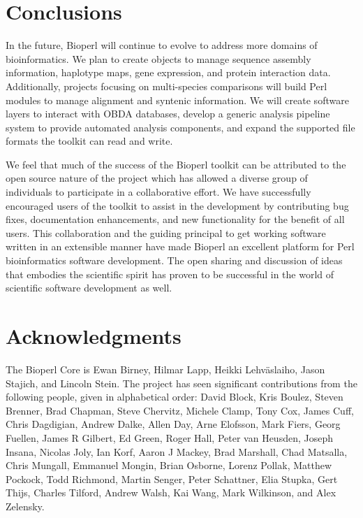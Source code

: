 \documentclass[12pt]{article}
\begin{document}
\section{Conclusions}

In the future, Bioperl will continue to evolve to address more domains
of bioinformatics.  We plan to create objects to manage sequence
assembly information, haplotype maps, gene expression, and protein
interaction data.  Additionally, projects focusing on multi-species
comparisons will build Perl modules to manage alignment and syntenic
information.  We will create software layers to interact with OBDA
databases, develop a generic analysis pipeline system to provide
automated analysis components, and expand the supported file formats
the toolkit can read and write.

We feel that much of the success of the Bioperl toolkit can be
attributed to the open source nature of the project which has allowed
a diverse group of individuals to participate in a collaborative effort.
We have successfully encouraged users of the toolkit to assist in the
development by contributing bug fixes, documentation enhancements, and
new functionality for the benefit of all users. This collaboration and
the guiding principal to get working software written in an extensible
manner have made Bioperl an excellent platform for Perl bioinformatics
software development.  The open sharing and discussion of ideas that
embodies the scientific spirit has proven to be successful in the
world of scientific software development as well.

\section{Acknowledgments}

The Bioperl Core is Ewan Birney, Hilmar Lapp, Heikki Lehv\"{a}slaiho,
Jason Stajich, and Lincoln Stein.  The project has seen significant
contributions from the following people, given in alphabetical order:
David Block, Kris Boulez, Steven Brenner, Brad Chapman, Steve
Chervitz, Michele Clamp, Tony Cox, James Cuff, Chris Dagdigian, Andrew
Dalke, Allen Day, Arne Elofsson, Mark Fiers, Georg Fuellen, James R
Gilbert, Ed Green, Roger Hall, Peter van Heusden, Joseph Insana,
Nicolas Joly, Ian Korf, Aaron J Mackey, Brad Marshall, Chad Matsalla,
Chris Mungall, Emmanuel Mongin, Brian Osborne, Lorenz Pollak, Matthew
Pockock, Todd Richmond, Martin Senger, Peter Schattner, Elia Stupka,
Gert Thijs, Charles Tilford, Andrew Walsh, Kai Wang, Mark Wilkinson,
and Alex Zelensky.
\end{document}
